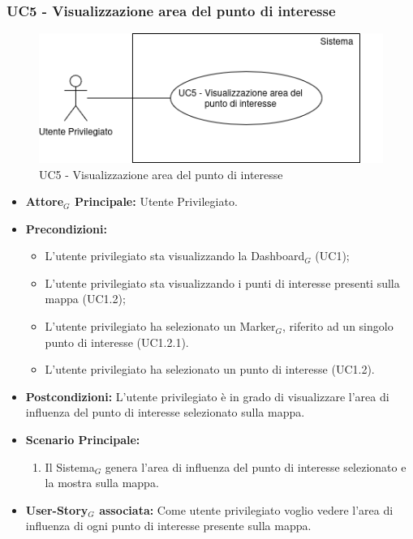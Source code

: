 \documentclass[10pt]{article}
\begin{document}
\begin{justify}
\subsubsection{\textbf{UC5 - Visualizzazione area del punto di interesse}}
\begin{figure}[H]
    \centering
    \includegraphics[width=0.7\linewidth]{UC5image.png}
    \caption{UC5 - Visualizzazione area del punto di interesse}
    \label{fig:UC5}
\end{figure}
\begin{itemize}
     \item \textbf{Attore$_G$ Principale:} Utente Privilegiato.
     \item \textbf{Precondizioni:}
        \begin{itemize}
    		\item L'utente privilegiato sta visualizzando la Dashboard$_G$ (UC1);
    	        \item L'utente privilegiato sta visualizzando i punti di interesse presenti sulla mappa (UC1.2);
    	        \item L'utente privilegiato ha selezionato un Marker$_G$, riferito ad un singolo punto di interesse (UC1.2.1).
            \item L'utente privilegiato ha selezionato un punto di interesse (UC1.2).
        \end{itemize}
     \item \textbf{Postcondizioni:} L'utente privilegiato è in grado di visualizzare l'area di influenza del punto di interesse selezionato sulla mappa.
     \item \textbf{Scenario Principale:}
        \begin{enumerate}
            \item Il Sistema$_G$ genera l'area di influenza del punto di interesse selezionato e la mostra sulla mappa.
        \end{enumerate}
     \item \textbf{User-Story$_G$ associata:}
     Come utente privilegiato voglio vedere l'area di influenza di ogni punto di interesse presente sulla mappa.
\end{itemize}


\end{justify}
\end{document}
